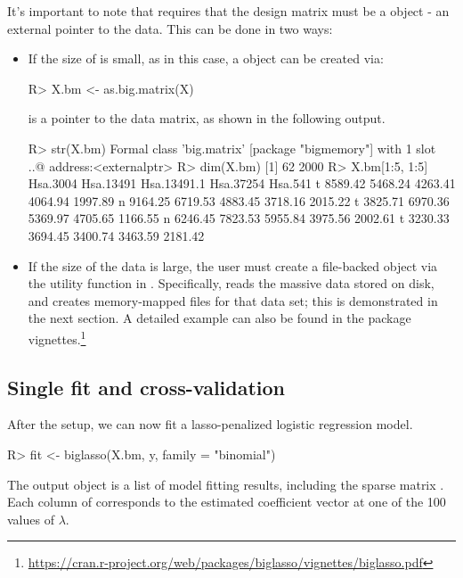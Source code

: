It's important to note that  requires that the design matrix  must be a  object - an external pointer to the data. This can be done in two ways:
\begin{itemize}
\item If the size of  is small, as in this case, a  object can be created via:

\begin{example}
R> X.bm <- as.big.matrix(X)
\end{example}

 is a pointer to the data matrix, as shown in the following output.
\begin{example}
R> str(X.bm)
Formal class 'big.matrix' [package "bigmemory"] with 1 slot
  ..@ address:<externalptr> 
R> dim(X.bm)
[1]   62 2000
R> X.bm[1:5, 1:5]
  Hsa.3004 Hsa.13491 Hsa.13491.1 Hsa.37254 Hsa.541
t  8589.42   5468.24     4263.41   4064.94 1997.89
n  9164.25   6719.53     4883.45   3718.16 2015.22
t  3825.71   6970.36     5369.97   4705.65 1166.55
n  6246.45   7823.53     5955.84   3975.56 2002.61
t  3230.33   3694.45     3400.74   3463.59 2181.42
\end{example}

\item If the size of the data is large, the user must create a file-backed  object via the utility function  in . Specifically,  reads the massive data stored on disk, and creates memory-mapped files for that data set; this is demonstrated in the next section. A detailed example can also be found in the package vignettes.\footnote{\url{https://cran.r-project.org/web/packages/biglasso/vignettes/biglasso.pdf}}

\end{itemize}

\subsection{Single fit and cross-validation}

After the setup, we can now fit a lasso-penalized logistic regression model.
\begin{example}
R> fit <- biglasso(X.bm, y, family = "binomial")
\end{example}

The output object  is a list of model fitting results, including the sparse matrix . Each column of  corresponds to the estimated coefficient vector at one of the 100 values of $\lambda$.


